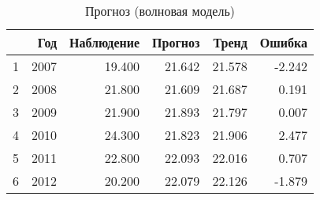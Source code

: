 \begin{table}[ht]
\centering
\begin{tabular}{rrrrrr}
  \hline
 & Год & Наблюдение & Прогноз & Тренд & Ошибка \\ 
  \hline
1 & 2007 & 19.400 & 21.642 & 21.578 & -2.242 \\ 
  2 & 2008 & 21.800 & 21.609 & 21.687 & 0.191 \\ 
  3 & 2009 & 21.900 & 21.893 & 21.797 & 0.007 \\ 
  4 & 2010 & 24.300 & 21.823 & 21.906 & 2.477 \\ 
  5 & 2011 & 22.800 & 22.093 & 22.016 & 0.707 \\ 
  6 & 2012 & 20.200 & 22.079 & 22.126 & -1.879 \\ 
   \hline
\end{tabular}
\caption{Прогноз (волновая модель)} 
\label{table:auto-class-20-prediction}
\end{table}
